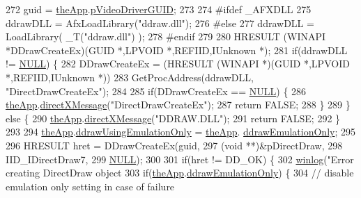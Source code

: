 \begin{DoxyCode}
{272     guid = \mbox{\hyperlink{_v_b_a_8cpp_a8095a9d06b37a7efe3723f3218ad8fb3}{theApp}}.\mbox{\hyperlink{class_v_b_a_a457e9b79d010d5ece39a37a2e73bde90}{pVideoDriverGUID}};
273 
274 \textcolor{preprocessor}{#ifdef \_AFXDLL}
275   ddrawDLL = AfxLoadLibrary(\textcolor{stringliteral}{"ddraw.dll"});
276 \textcolor{preprocessor}{#else}
277   ddrawDLL = LoadLibrary( \_T(\textcolor{stringliteral}{"ddraw.dll"}) );
278 \textcolor{preprocessor}{#endif}
279 
280   HRESULT (WINAPI *DDrawCreateEx)(GUID *,LPVOID *,REFIID,IUnknown *);  
281   \textcolor{keywordflow}{if}(ddrawDLL != \mbox{\hyperlink{getopt1_8c_a070d2ce7b6bb7e5c05602aa8c308d0c4}{NULL}}) \{    
282     DDrawCreateEx = (HRESULT (WINAPI *)(GUID *,LPVOID *,REFIID,IUnknown *))
283       GetProcAddress(ddrawDLL, \textcolor{stringliteral}{"DirectDrawCreateEx"});
284 
285     \textcolor{keywordflow}{if}(DDrawCreateEx == \mbox{\hyperlink{getopt1_8c_a070d2ce7b6bb7e5c05602aa8c308d0c4}{NULL}}) \{
286       \mbox{\hyperlink{_v_b_a_8cpp_a8095a9d06b37a7efe3723f3218ad8fb3}{theApp}}.\mbox{\hyperlink{class_v_b_a_acb1288f72a2122817f05df2da91a67d2}{directXMessage}}(\textcolor{stringliteral}{"DirectDrawCreateEx"});
287       \textcolor{keywordflow}{return} FALSE;
288     \}
289   \} \textcolor{keywordflow}{else} \{
290     \mbox{\hyperlink{_v_b_a_8cpp_a8095a9d06b37a7efe3723f3218ad8fb3}{theApp}}.\mbox{\hyperlink{class_v_b_a_acb1288f72a2122817f05df2da91a67d2}{directXMessage}}(\textcolor{stringliteral}{"DDRAW.DLL"});
291     \textcolor{keywordflow}{return} FALSE;
292   \}
293 
294   \mbox{\hyperlink{_v_b_a_8cpp_a8095a9d06b37a7efe3723f3218ad8fb3}{theApp}}.\mbox{\hyperlink{class_v_b_a_a88c703304afd9e17cd80cf3e3a825f7f}{ddrawUsingEmulationOnly}} = \mbox{\hyperlink{_v_b_a_8cpp_a8095a9d06b37a7efe3723f3218ad8fb3}{theApp}}.
      \mbox{\hyperlink{class_v_b_a_a18c0ee1eaa744d8061ce94ce6ed870fd}{ddrawEmulationOnly}};
295   
296   HRESULT hret = DDrawCreateEx(guid,
297                                (\textcolor{keywordtype}{void} **)&pDirectDraw,
298                                IID\_IDirectDraw7,
299                                \mbox{\hyperlink{getopt1_8c_a070d2ce7b6bb7e5c05602aa8c308d0c4}{NULL}});
300     
301   \textcolor{keywordflow}{if}(hret != DD\_OK) \{
302     \mbox{\hyperlink{_direct_draw_8cpp_aceca31284db939464c9dc0fb15c92786}{winlog}}(\textcolor{stringliteral}{"Error creating DirectDraw object %
303     \textcolor{keywordflow}{if}(\mbox{\hyperlink{_v_b_a_8cpp_a8095a9d06b37a7efe3723f3218ad8fb3}{theApp}}.\mbox{\hyperlink{class_v_b_a_a18c0ee1eaa744d8061ce94ce6ed870fd}{ddrawEmulationOnly}}) \{
304       \textcolor{comment}{// disable emulation only setting in case of failure}
}}
\end{DoxyCode}
